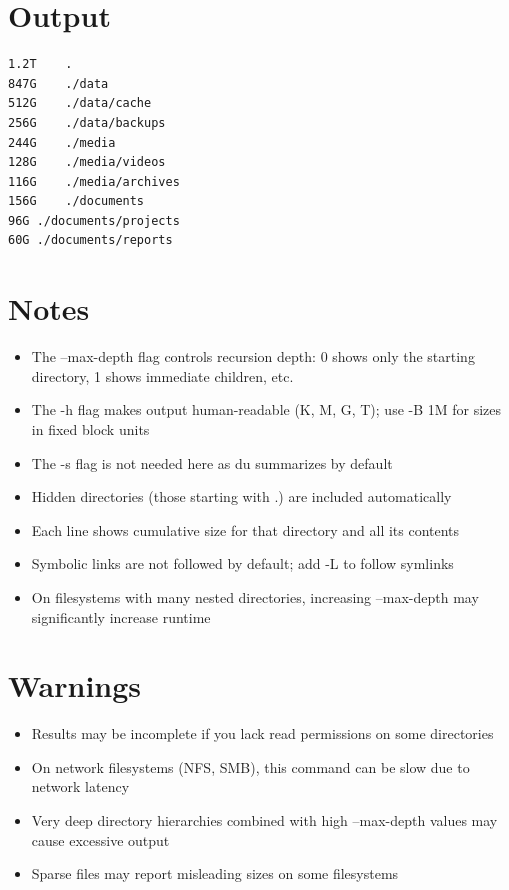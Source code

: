 \documentclass[openany]{book}
\begin{document}
\section*{Output}
\begin{lstlisting}
1.2T	.
847G	./data
512G	./data/cache
256G	./data/backups
244G	./media
128G	./media/videos
116G	./media/archives
156G	./documents
96G	./documents/projects
60G	./documents/reports
\end{lstlisting}

\section*{Notes}
\begin{itemize}
  \item The --max-depth flag controls recursion depth: 0 shows only the starting directory, 1 shows immediate children, etc.
  \item The -h flag makes output human-readable (K, M, G, T); use -B 1M for sizes in fixed block units
  \item The -s flag is not needed here as du summarizes by default
  \item Hidden directories (those starting with .) are included automatically
  \item Each line shows cumulative size for that directory and all its contents
  \item Symbolic links are not followed by default; add -L to follow symlinks
  \item On filesystems with many nested directories, increasing --max-depth may significantly increase runtime
\end{itemize}

\section*{Warnings}
\begin{itemize}
  \item Results may be incomplete if you lack read permissions on some directories
  \item On network filesystems (NFS, SMB), this command can be slow due to network latency
  \item Very deep directory hierarchies combined with high --max-depth values may cause excessive output
  \item Sparse files may report misleading sizes on some filesystems
\end{itemize}
\end{document}
